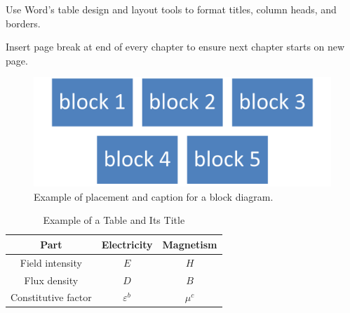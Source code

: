 Use Word's table design and layout tools to format titles, column heads, and borders.

Insert page break at end of every chapter to ensure next chapter starts on new page.

\begin{figure}[H]
    \centering
    \includegraphics[width=\textwidth]{figures/block.png}
    \caption{Example of placement and caption for a block diagram.}
    \label{fig:example_fig}
\end{figure}

\begin{table}[H]
    \centering
    \caption{Example of a Table and Its Title}
    \label{tab:example_table}
    \begin{tabular}{ccc}
        \hline
        \textbf{Part} & \textbf{Electricity} & \textbf{Magnetism} \\ \hline
        Field intensity & $E$ & $H$ \\
        Flux density & $D$ & $B$ \\
        Constitutive factor & $\varepsilon^b$ & $\mu^c$ \\\hline
    \end{tabular}
\end{table}
